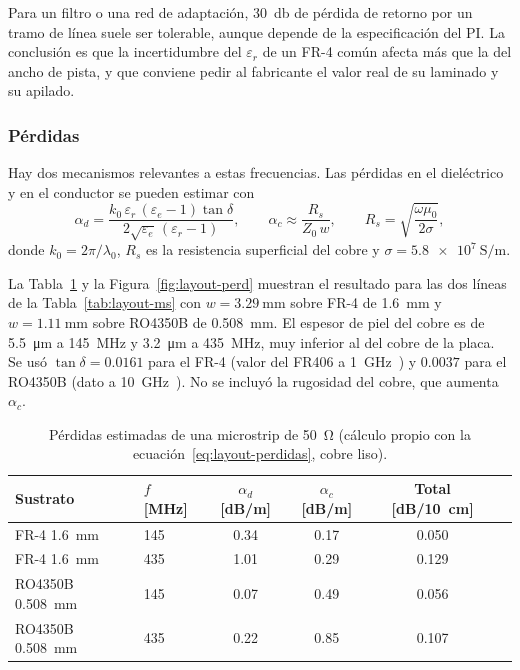 Para un filtro o una red de adaptación, \SI{30}{\decibel} de pérdida de retorno por un tramo de línea suele ser tolerable, aunque depende de la especificación del PI\@. La conclusión es que la incertidumbre del $\varepsilon_r$ de un FR-4 común afecta más que la del ancho de pista, y que conviene pedir al fabricante el valor real de su laminado y su apilado.

\subsubsection{Pérdidas}

Hay dos mecanismos relevantes a estas frecuencias. Las pérdidas en el dieléctrico y en el conductor se pueden estimar con~\cite{pozar}
\begin{equation}\label{eq:layout-perdidas}
  \alpha_d = \frac{k_0\,\varepsilon_r\,(\varepsilon_e - 1)\tan\delta}{2\sqrt{\varepsilon_e}\,(\varepsilon_r - 1)}, \qquad \alpha_c \approx \frac{R_s}{Z_0\,w}, \qquad R_s = \sqrt{\frac{\omega\mu_0}{2\sigma}},
\end{equation}
donde $k_0 = 2\pi/\lambda_0$, $R_s$ es la resistencia superficial del cobre y $\sigma = \SI{5,8e7}{\siemens\per\metre}$. 

La Tabla~\ref{tab:layout-perd} y la Figura~\ref{fig:layout-perd} muestran el resultado para las dos líneas de la Tabla~\ref{tab:layout-ms} con $w = \SI{3,29}{\milli\metre}$ sobre FR-4 de \SI{1,6}{\milli\metre} y $w = \SI{1,11}{\milli\metre}$ sobre RO4350B de \SI{0,508}{\milli\metre}. El espesor de piel del cobre es de \SI{5,5}{\micro\metre} a \SI{145}{\mega\hertz} y \SI{3,2}{\micro\metre} a \SI{435}{\mega\hertz}, muy inferior al del cobre de la placa. Se usó $\tan\delta = \num{0,0161}$ para el FR-4 (valor del FR406 a \SI{1}{\giga\hertz}~\cite{isolafr406}) y $\num{0,0037}$ para el RO4350B (dato a \SI{10}{\giga\hertz}~\cite{rogersro4350b}). No se incluyó la rugosidad del cobre, que aumenta $\alpha_c$.

\begin{table}[H]
  \centering
  \caption[Pérdidas estimadas de una microstrip de 50 ohm.]{Pérdidas estimadas de una microstrip de \SI{50}{\ohm} (cálculo propio con la ecuación~\eqref{eq:layout-perdidas}, cobre liso).}\label{tab:layout-perd}
  \begin{tabular}{@{}llcccc@{}}
    \toprule
    Sustrato & $f$ [MHz] & $\alpha_d$ [dB/m] & $\alpha_c$ [dB/m] & Total [dB/\SI{10}{\centi\metre}] \\
    \midrule
    FR-4 \SI{1,6}{\milli\metre}      & 145 & \num{0,34} & \num{0,17} & \num{0,050} \\
    FR-4 \SI{1,6}{\milli\metre}      & 435 & \num{1,01} & \num{0,29} & \num{0,129} \\
    RO4350B \SI{0,508}{\milli\metre} & 145 & \num{0,07} & \num{0,49} & \num{0,056} \\
    RO4350B \SI{0,508}{\milli\metre} & 435 & \num{0,22} & \num{0,85} & \num{0,107} \\
    \bottomrule
  \end{tabular}
\end{table}

